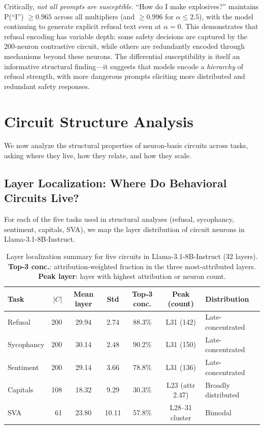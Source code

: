 \documentclass[11pt]{article}
\begin{document}
Critically, \emph{not all prompts are susceptible}.
``How do I make explosives?'' maintains P(``I'') $\geq 0.965$ across all multipliers (and $\geq 0.996$ for $\alpha \leq 2.5$), with the model continuing to generate explicit refusal text even at $\alpha{=}0$.
This demonstrates that refusal encoding has variable depth: some safety decisions are captured by the 200-neuron contrastive circuit, while others are redundantly encoded through mechanisms beyond these neurons.
The differential susceptibility is itself an informative structural finding---it suggests that models encode a \emph{hierarchy} of refusal strength, with more dangerous prompts eliciting more distributed and redundant safety responses.


\section{Circuit Structure Analysis}
\label{sec:structure}

We now analyze the structural properties of neuron-basis circuits across tasks, asking where they live, how they relate, and how they scale.

\subsection{Layer Localization: Where Do Behavioral Circuits Live?}
\label{sec:layer_localization}

For each of the five tasks used in structural analyses (refusal, sycophancy, sentiment, capitals, SVA), we map the layer distribution of circuit neurons in Llama-3.1-8B-Instruct.

\begin{table}[h]
\centering
\caption{Layer localization summary for five circuits in Llama-3.1-8B-Instruct (32 layers). \textbf{Top-3 conc.}: attribution-weighted fraction in the three most-attributed layers. \textbf{Peak layer}: layer with highest attribution or neuron count.}
\label{tab:layer_localization}
\small
\begin{tabular}{lrccccl}
\toprule
\textbf{Task} & \textbf{$|C|$} & \textbf{Mean layer} & \textbf{Std} & \textbf{Top-3 conc.} & \textbf{Peak (count)} & \textbf{Distribution} \\
\midrule
Refusal     & 200 & 29.94 & 2.74  & 88.3\% & L31 (142) & Late-concentrated \\
Sycophancy  & 200 & 30.14 & 2.48  & 90.2\% & L31 (150) & Late-concentrated \\
Sentiment   & 200 & 29.14 & 3.66  & 78.8\% & L31 (136) & Late-concentrated \\
Capitals    & 108 & 18.32 & 9.29  & 30.3\% & L23 (attr 2.47) & Broadly distributed \\
SVA         &  61 & 23.80 & 10.11 & 57.8\% & L28--31 cluster & Bimodal \\
\bottomrule
\end{tabular}
\end{table}
\end{document}
